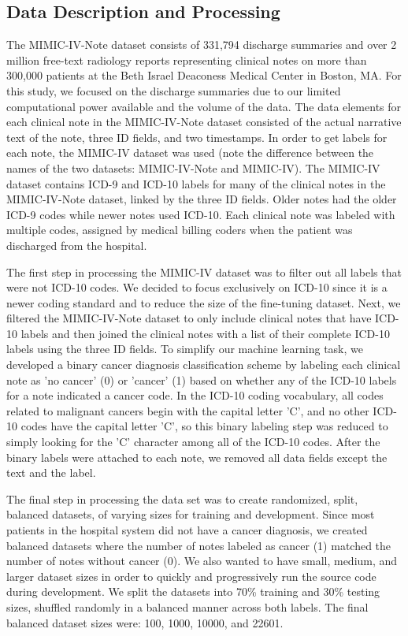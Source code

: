 \documentclass[manuscript,screen,review,nonacm]{acmart}
\begin{document}
\subsection{Data Description and Processing}
The MIMIC-IV-Note dataset consists of 331,794 discharge summaries and over 2 million free-text radiology reports representing clinical notes on more than 300,000 patients at the Beth Israel Deaconess Medical Center in Boston, MA. For this study, we focused on the discharge summaries due to our limited computational power available and the volume of the data. The data elements for each clinical note in the MIMIC-IV-Note dataset consisted of the actual narrative text of the note, three ID fields, and two timestamps\cite{dischnote}. In order to get labels for each note, the MIMIC-IV dataset\cite{johnson2023mimic} was used (note the difference between the names of the two datasets: MIMIC-IV-Note and MIMIC-IV). The MIMIC-IV dataset contains ICD-9 and ICD-10\cite{worldicd} labels for many of the clinical notes in the MIMIC-IV-Note dataset, linked by the three ID fields. Older notes had the older ICD-9 codes while newer notes used ICD-10. Each clinical note was labeled with multiple codes, assigned by medical billing coders when the patient was discharged from the hospital. 

The first step in processing the MIMIC-IV dataset was to filter out all labels that were not ICD-10 codes. We decided to focus exclusively on ICD-10 since it is a newer coding standard and to reduce the size of the fine-tuning dataset. Next, we filtered the MIMIC-IV-Note dataset to only include clinical notes that have ICD-10 labels and then joined the clinical notes with a list of their complete ICD-10 labels using the three ID fields. To simplify our machine learning task, we developed a binary cancer diagnosis classification scheme by labeling each clinical note as 'no cancer' (0) or 'cancer' (1) based on whether any of the ICD-10 labels for a note indicated a cancer code. In the ICD-10 coding vocabulary, all codes related to malignant cancers begin with the capital letter 'C', and no other ICD-10 codes have the capital letter 'C', so this binary labeling step was reduced to simply looking for the 'C' character among all of the ICD-10 codes. After the binary labels were attached to each note, we removed all data fields except the text and the label. 

The final step in processing the data set was to create randomized, split, balanced datasets, of varying sizes for training and development. Since most patients in the hospital system did not have a cancer diagnosis, we created balanced datasets where the number of notes labeled as cancer (1) matched the number of notes without cancer (0). We also wanted to have small, medium, and larger dataset sizes in order to quickly and progressively run the source code during development. We split the datasets into 70\% training and 30\% testing sizes, shuffled randomly in a balanced manner across both labels. The final balanced dataset sizes were: 100, 1000, 10000, and 22601.
\end{document}
